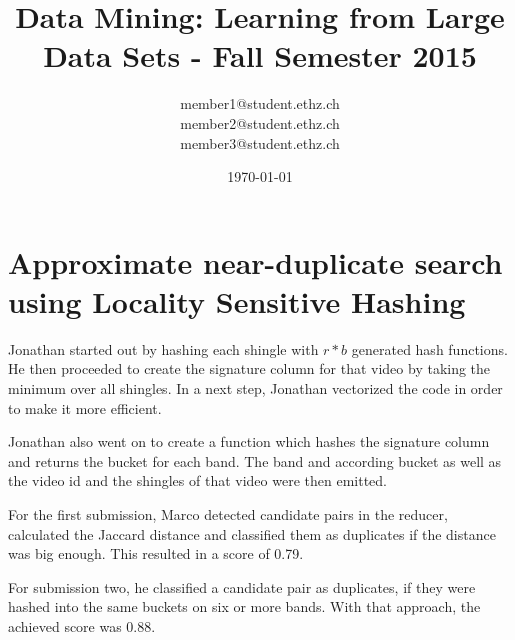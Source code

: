 \documentclass[a4paper, 11pt]{article}
\title{Data Mining: Learning from Large Data Sets - Fall Semester 2015}
\author{member1@student.ethz.ch\\ member2@student.ethz.ch\\ member3@student.ethz.ch\\}
\date{\today}
\begin{document}
\maketitle

\section*{Approximate near-duplicate search using Locality Sensitive Hashing} 
Jonathan started out by hashing each shingle with $r * b$ generated hash functions. He then proceeded to create the signature column for that video by taking the minimum over all shingles. In a next step, Jonathan vectorized the code in order to make it more efficient.

Jonathan also went on to create a function which hashes the signature column and returns the bucket for each band. The band and according bucket as well as  the video id and the shingles of that video were then emitted.

For the first submission, Marco detected candidate pairs in the reducer, calculated the Jaccard distance and classified them as duplicates if the distance was big enough. This resulted in a score of 0.79.

For submission two, he classified a candidate pair as duplicates, if they were hashed into the same buckets on six or more bands. With that approach, the achieved score was 0.88.
\end{document}
